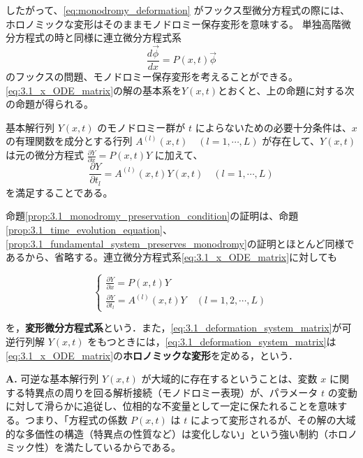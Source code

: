 したがって、\eqref{eq:monodromy_deformation} がフックス型微分方程式の際には、ホロノミックな変形はそのままモノドロミー保存変形を意味する。
単独高階微分方程式の時と同様に連立微分方程式系
\begin{equation}\label{eq:3.1_x_ODE_matrix}
\frac{d \vec{\phi}}{dx} = P(x,t)\vec{\phi}
\end{equation}
のフックスの問題、モノドロミー保存変形を考えることができる。\eqref{eq:3.1_x_ODE_matrix}の解の基本系を$Y(x,t)$とおくと、上の命題に対する次の命題が得られる。
\begin{proposition}\label{prop:3.1_monodromy_preservation_condition}
基本解行列 $Y(x,t)$ のモノドロミー群が $t$ によらないための必要十分条件は、$x$ の有理関数を成分とする行列 $A^{(l)}(x,t) \quad (l=1,\cdots,L)$ が存在して、$Y(x,t)$ は元の微分方程式 $\frac{\partial Y}{\partial x} = P(x,t)Y$ に加えて、
\begin{equation}
\frac{\partial Y}{\partial t_l} = A^{(l)}(x,t)Y(x,t) \quad (l=1,\cdots,L)
\label{eq:3.1_t_ODE_matrix}
\end{equation}
を満足することである。
\end{proposition}

命題\ref{prop:3.1_monodromy_preservation_condition}の証明は、命題\ref{prop:3.1_time_evolution_equation}、\ref{prop:3.1_fundamental_system_preserves_monodromy}の証明とほとんど同様であるから、省略する。連立微分方程式系\eqref{eq:3.1_x_ODE_matrix}に対しても

\begin{equation}\label{eq:3.1_deformation_system_matrix}
  \begin{cases}
    \displaystyle \frac{\partial Y}{\partial x} = P(x,t)Y \\[4mm]
    \displaystyle \frac{\partial Y}{\partial t_l} = A^{(l)}(x,t)Y \quad (l=1,2,\cdots,L)
  \end{cases}
\end{equation}

を，\textbf{変形微分方程式系}という．また，\eqref{eq:3.1_deformation_system_matrix}が可逆行列解 $Y(x,t)$ をもつときには，\eqref{eq:3.1_deformation_system_matrix}は\eqref{eq:3.1_x_ODE_matrix}の\textbf{ホロノミックな変形}を定める，という．

\begin{Q}
\textbf{A.} 可逆な基本解行列 $Y(x,t)$ が大域的に存在するということは、変数 $x$ に関する特異点の周りを回る解析接続（モノドロミー表現）が、パラメータ $t$ の変動に対して滑らかに追従し、位相的な不変量として一定に保たれることを意味する。つまり、「方程式の係数 $P(x,t)$ は $t$ によって変形されるが、その解の大域的な多価性の構造（特異点の性質など）は変化しない」という強い制約（ホロノミック性）を満たしているからである。
\end{Q}

